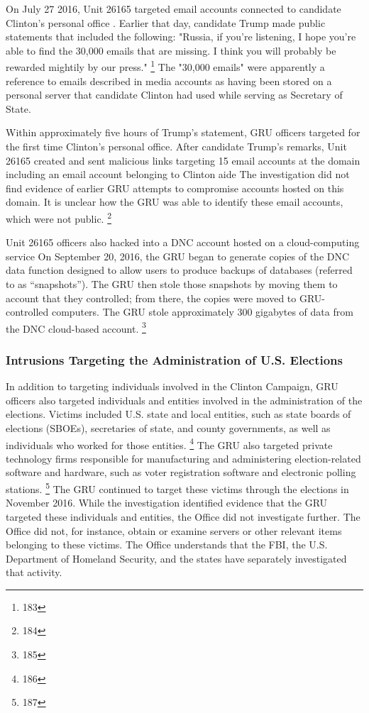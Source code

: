 On July 27 2016, Unit 26165 targeted email accounts connected to candidate Clinton's personal office .
Earlier that day, candidate Trump made public statements that included the following: "Russia, if you're listening, I hope you're able to find the 30,000 emails that are missing.
I think you will probably be rewarded mightily by our press."%
\footnote{183}
The "30,000 emails" were apparently a reference to emails described in media accounts as having been stored on a personal server that candidate Clinton had used while serving as Secretary of State.

Within approximately five hours of Trump's statement, GRU officers targeted for the first time Clinton's personal office.
After candidate Trump's remarks, Unit 26165 created and sent malicious links targeting 15 email accounts at the domain  including an email account belonging to Clinton aide 
The investigation did not find evidence of earlier GRU attempts to compromise accounts hosted on this domain.
It is unclear how the GRU was able to identify these email accounts, which were not public.%
\footnote{184}

Unit 26165 officers also hacked into a DNC account hosted on a cloud-computing service 
On September 20, 2016, the GRU began to generate copies of the DNC data  function designed to allow users to produce backups of databases (referred to  as ``snapshots'').
The GRU then stole those snapshots by moving them to  account that they controlled; from there, the copies were moved to GRU-controlled computers.
The GRU stole approximately 300 gigabytes of data from the DNC cloud-based account.%
\footnote{185}

\subsubsection{Intrusions Targeting the Administration of U.S. Elections}

In addition to targeting individuals involved in the Clinton Campaign, GRU officers also targeted individuals and entities involved in the administration of the elections.
Victims included U.S. state and local entities, such as state boards of elections (SBOEs), secretaries of state, and county governments, as well as individuals who worked for those entities.%
\footnote{186}
The GRU also targeted private technology firms responsible for manufacturing and administering election-related software and hardware, such as voter registration software and electronic polling stations.%
\footnote{187}
The GRU continued to target these victims through the elections in November 2016.
While the investigation identified evidence that the GRU targeted these individuals and entities, the Office did not investigate further.
The Office did not, for instance, obtain or examine servers or other relevant items belonging to these victims.
The Office understands that the FBI, the U.S. Department of Homeland Security, and the states have separately investigated that activity.

